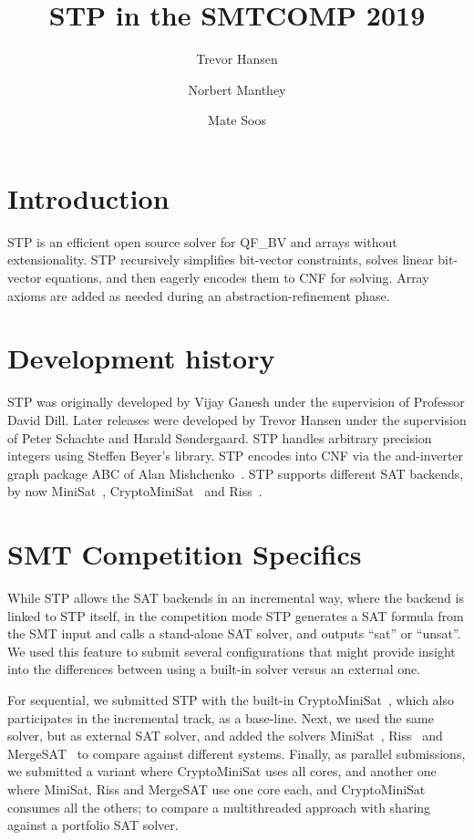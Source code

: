 \documentclass{easychair}
\begin{document}
\title{STP in the SMTCOMP 2019}
\author{Trevor Hansen \and Norbert Manthey \and Mate Soos}

\maketitle
\thispagestyle{empty}
\pagestyle{empty}

\section{Introduction}
STP\cite{Vijay:Thesis:2007} is an efficient open source solver for QF\_BV and arrays without extensionality. STP recursively simplifies bit-vector constraints, solves linear bit-vector equations, and then eagerly encodes them to CNF for solving. Array axioms are added as needed during an abstraction-refinement phase.

\section{Development history}
STP was originally developed by Vijay Ganesh under the supervision of Professor David Dill. Later releases were developed by Trevor Hansen under the supervision of Peter Schachte and Harald Søndergaard. STP handles arbitrary precision integers using Steffen Beyer's library. STP encodes into CNF via the and-inverter graph package ABC of Alan Mishchenko~\cite{Brayton:2010:AAI:2144310.2144317}.
STP supports different SAT backends, by now MiniSat~\cite{MiniSat:github}, CryptoMiniSat~\cite{CMS:github} and Riss~\cite{Riss:github}.

\section{SMT Competition Specifics}

While STP allows the SAT backends in an incremental way, where the backend is linked to STP itself, in the competition mode STP generates a SAT formula from the SMT input and calls a stand-alone SAT solver, and outputs ``sat'' or ``unsat''.
We used this feature to submit several configurations that might provide insight into the differences between using a built-in solver versus an external one.

For sequential, we submitted STP with the built-in CryptoMiniSat~\cite{CMS:github}, which also participates in the incremental track, as a base-line.
Next, we used the same solver, but as external SAT solver, and added the solvers MiniSat~\cite{MiniSat:github}, Riss~\cite{Riss:github} and MergeSAT~\cite{MergeSAT:github} to compare against different systems.
Finally, as parallel submissions, we submitted a variant where CryptoMiniSat uses all cores, and another one where MiniSat, Riss and MergeSAT use one core each, and CryptoMiniSat consumes all the others; to compare a multithreaded approach with sharing against a portfolio SAT solver.
\end{document}

